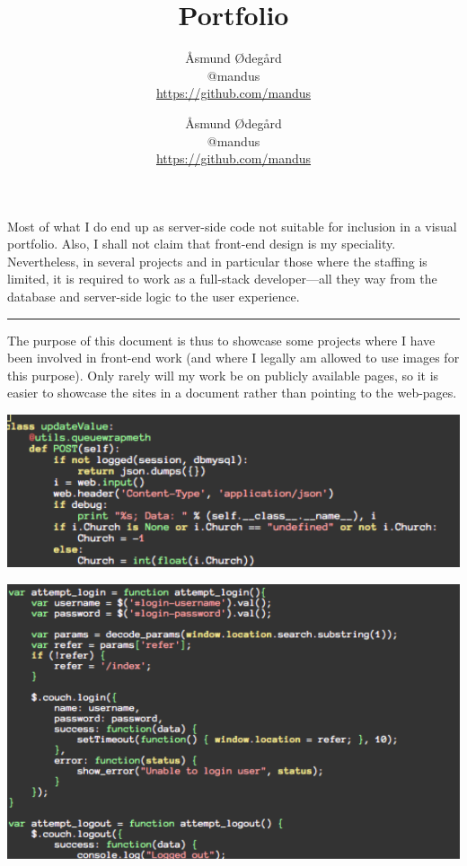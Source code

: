 \documentclass[11pt]{article}
\title{\vspace*{-1\baselineskip}Portfolio}
\author{Åsmund Ødegård \\ @mandus \\ \url{https://github.com/mandus}}\author{Åsmund Ødegård \\ @mandus \\ \url{https://github.com/mandus}}
\date{}                                           %
\begin{document}
\fontsize{11}{15}\selectfont
\maketitle
\thispagestyle{empty}

\begin{minipage}[b]{0.45\textwidth}
Most of what I do end up as server-side code not suitable for inclusion in a visual portfolio. Also, I shall not claim that front-end design is my speciality. Nevertheless, in several projects and in particular those where the staffing is limited, it is required to work as a full-stack developer---all they way from the database and server-side logic to the user experience.
\end{minipage}
\hfill\rule[-1.7cm]{0.2pt}{5.7cm}\hfill
\begin{minipage}[m]{0.45\textwidth}
The purpose of this document is thus to showcase some projects where I have been involved in front-end work (and where I legally am allowed to use images for this purpose). Only rarely will my work be on publicly available pages, so it is easier to showcase the sites in a document rather than pointing to the web-pages. 
\end{minipage}

\vspace{2cm}
\includegraphics[scale=0.8]{portfolio-graphics/py-code.pdf}

\vspace{-3cm}
\hfill
\includegraphics[scale=0.7]{portfolio-graphics/js-code.pdf}
\end{document}
